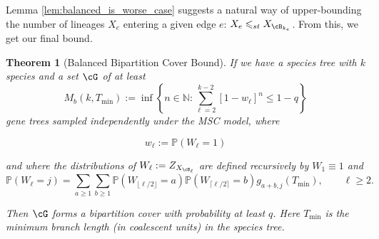 \documentclass[10pt,oneside,reqno]{article}
\theoremstyle{plain}
\newtheorem{theorem}{Theorem}[section]
\theoremstyle{definition}
\numberwithin{equation}{section}
\renewcommand{\leq}{\leqslant}
\renewcommand{\geq}{\geqslant}
\newcommand{\N}{\mathbb{N}}
\renewcommand{\P}{\mathbb{P}}
\begin{document}
Lemma \ref{lem:balanced_is_worse_case} suggests a natural way of upper-bounding 
the number of lineages $X_e$ entering a given edge $e$: $X_e \leq_{st} X_{\cB_{k_e}}$. From this, we get our final bound.


\begin{theorem}[Balanced Bipartition Cover Bound]
If we have a species tree with $k$ species and a set $\cG$ of at least
%
\begin{equation}
    M_b(k, T_{\mathrm{min}}):=  \inf\left\{n \in \N : \sum_{\ell=2}^{k-2}\left[1-w_\ell\right]^n \leq 1-q\right\}
\label{eqn:balanced-bound}
\end{equation}
%
\noindent gene trees sampled independently under the MSC model, where

\begin{equation}
    w_\ell := \P(W_{\ell} = 1)
    \label{eqn:def_of_zl}
\end{equation}

\noindent and where the distributions of $W_\ell := Z_{X_{\cB_\ell}}$ are defined recursively by $W_1 \equiv 1$ and
%
\begin{equation}
\P(W_\ell=j)
=
\sum_{a\geq 1}\sum_{b\geq 1}
\P\left(W_{\lfloor\ell/2\rfloor}=a\right)
\P\left(W_{\lceil\ell/2\rceil}=b\right)
g_{a+b,j}(T_{\mathrm{min}}),
\qquad \ell\geq 2.
\label{eqn:balanced-W-recursion}
\end{equation}

\noindent Then $\cG$ forms a bipartition cover with probability at least $q$. Here $T_{\mathrm{min}}$ is the minimum branch length (in coalescent units) in the species tree.
\label{thm:improved_bipartition_cover_bound_balanced}
\end{theorem}
\end{document}
